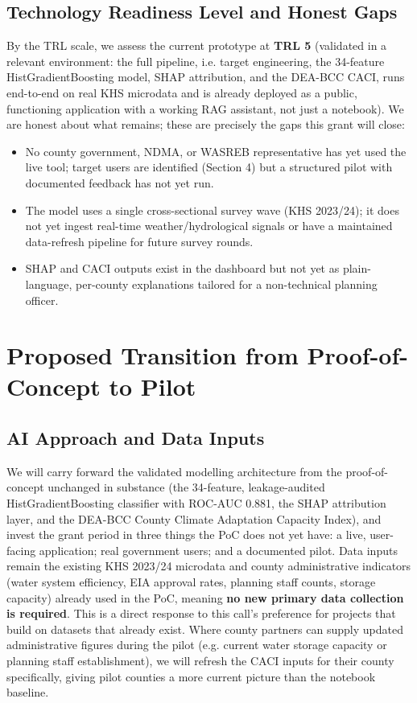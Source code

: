 \documentclass[12pt,a4paper]{article}
\begin{document}
\subsection{Technology Readiness Level and Honest Gaps}
By the TRL scale, we assess the current prototype at \textbf{TRL 5} (validated in a relevant environment: the full pipeline, i.e. target engineering, the 34-feature HistGradientBoosting model, SHAP attribution, and the DEA-BCC CACI, runs end-to-end on real KHS microdata and is already deployed as a public, functioning application with a working RAG assistant, not just a notebook). We are honest about what remains; these are precisely the gaps this grant will close:

\begin{itemize}[leftmargin=1.2em, itemsep=1pt]
\item No county government, NDMA, or WASREB representative has yet used the live tool; target users are identified (Section 4) but a structured pilot with documented feedback has not yet run.
\item The model uses a single cross-sectional survey wave (KHS 2023/24); it does not yet ingest real-time weather/hydrological signals or have a maintained data-refresh pipeline for future survey rounds.
\item SHAP and CACI outputs exist in the dashboard but not yet as plain-language, per-county explanations tailored for a non-technical planning officer.
\end{itemize}

\newpage
\section{Proposed Transition from Proof-of-Concept to Pilot}

\subsection{AI Approach and Data Inputs}
We will carry forward the validated modelling architecture from the proof-of-concept unchanged in substance (the 34-feature, leakage-audited HistGradientBoosting classifier with ROC-AUC 0.881, the SHAP attribution layer, and the DEA-BCC County Climate Adaptation Capacity Index), and invest the grant period in three things the PoC does not yet have: a live, user-facing application; real government users; and a documented pilot. Data inputs remain the existing KHS 2023/24 microdata and county administrative indicators (water system efficiency, EIA approval rates, planning staff counts, storage capacity) already used in the PoC, meaning \textbf{no new primary data collection is required}. This is a direct response to this call's preference for projects that build on datasets that already exist. Where county partners can supply updated administrative figures during the pilot (e.g. current water storage capacity or planning staff establishment), we will refresh the CACI inputs for their county specifically, giving pilot counties a more current picture than the notebook baseline.
\end{document}
